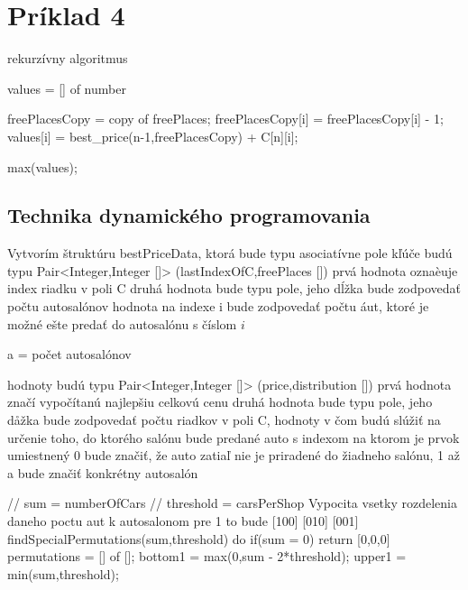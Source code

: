 \documentclass[paper=a4, fontsize=11pt]{scrartcl} %
\numberwithin{equation}{section} %
\numberwithin{figure}{section} %
\numberwithin{table}{section} %
\begin{document}
\pagebreak


\section*{Príklad 4}

rekurzívny algoritmus

\begin{algorithmic}[1]
        \State {}
    \EndIf

    \State values = [] of number

            \State freePlacesCopy = copy of freePlaces;			
            \State	freePlacesCopy[i] = freePlacesCopy[i] - 1;			
            \State values[i] = best\_price(n-1,freePlacesCopy) + C[n][i];
        \EndIf
    \EndFor

    \State \Return max(values);
\EndFunction
\end{algorithmic}

\subsection*{Technika dynamického programovania}

Vytvorím štruktúru bestPriceData, ktorá bude typu asociatívne pole
kľúče budú typu Pair<Integer,Integer []>
(lastIndexOfC,freePlaces [])
prvá hodnota oznaèuje index riadku v poli C
druhá hodnota bude typu pole, jeho dĺžka bude zodpovedať počtu autosalónov
hodnota na indexe i bude zodpovedať počtu áut, ktoré je možné ešte predať do autosalónu s číslom $i$

a = počet autosalónov

hodnoty budú typu Pair<Integer,Integer []>
(price,distribution [])
prvá hodnota značí vypočítanú najlepšiu celkovú cenu
druhá hodnota bude typu pole, jeho dåžka bude zodpovedať počtu riadkov v poli C,
hodnoty v čom budú slúžiť na určenie toho, do ktorého salónu bude predané auto s indexom na ktorom je prvok umiestnený
0 bude značiť, že auto zatiaľ nie je priradené do žiadneho salónu, 1 až a bude značiť konkrétny autosalón




// sum = numberOfCars
// threshold = carsPerShop
Vypocita vsetky rozdelenia daneho poctu aut k autosalonom pre 1 to bude [100] [010] [001]
findSpecialPermutations(sum,threshold) do
	if(sum = 0) return [0,0,0]
	permutations = [] of [];
	bottom1 = max(0,sum - 2*threshold);
	upper1 = min(sum,threshold);
	
\end{document}

